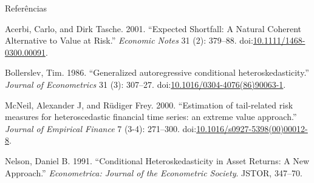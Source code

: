 \documentclass[ignorenonframetext,]{beamer}
\begin{document}
\begin{frame}{Referências}

\hypertarget{refs}{}
\hypertarget{ref-Acerbi2001}{}
Acerbi, Carlo, and Dirk Tasche. 2001. ``Expected Shortfall: A Natural
Coherent Alternative to Value at Risk.'' \emph{Economic Notes} 31 (2):
379--88.
doi:\href{https://doi.org/10.1111/1468-0300.00091}{10.1111/1468-0300.00091}.

\hypertarget{ref-Bollerslev1986}{}
Bollerslev, Tim. 1986. ``Generalized autoregressive conditional
heteroskedasticity.'' \emph{Journal of Econometrics} 31 (3): 307--27.
doi:\href{https://doi.org/10.1016/0304-4076(86)90063-1}{10.1016/0304-4076(86)90063-1}.

\hypertarget{ref-McNeil2000}{}
McNeil, Alexander J, and Rüdiger Frey. 2000. ``Estimation of
tail-related risk measures for heteroscedastic financial time series: an
extreme value approach.'' \emph{Journal of Empirical Finance} 7 (3-4):
271--300.
doi:\href{https://doi.org/10.1016/s0927-5398(00)00012-8}{10.1016/s0927-5398(00)00012-8}.

\hypertarget{ref-Nelson1991}{}
Nelson, Daniel B. 1991. ``Conditional Heteroskedasticity in Asset
Returns: A New Approach.'' \emph{Econometrica: Journal of the
Econometric Society}. JSTOR, 347--70.

\end{frame}
\end{document}
